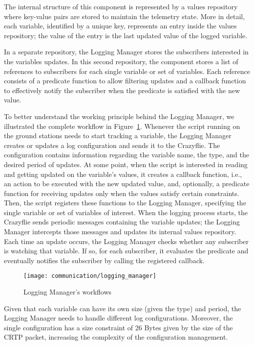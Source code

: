 The internal structure of this component is represented by a values repository where key-value pairs are stored to maintain the telemetry state.
More in detail, each variable, identified by a unique key, represents an entry inside the values repository; the value of the entry is the last updated value of the logged variable.

In a separate repository, the Logging Manager stores the subscribers interested in the variables updates. 
In this second repository, the component stores a list of references to subscribers for each single variable or set of variables. 
Each reference consists of a predicate function to allow filtering updates and a callback function to effectively notify the subscriber when the predicate is satisfied with the new value.

To better understand the working principle behind the Logging Manager, we illustrated the complete workflow in Figure~\ref{fig:logging_manager}.
Whenever the script running on the ground stations needs to start tracking a variable, the Logging Manager creates or updates a log configuration and sends it to the Crazyflie.
The configuration contains information regarding the variable name, the type, and the desired period of updates. 
At some point, when the script is interested in reading and getting updated on the variable's values, it creates a callback function, i.e., an action to be executed with the new updated value, and, optionally, a predicate function for receiving updates only when the values satisfy certain constraints.
Then, the script registers these functions to the Logging Manager, specifying the single variable or set of variables of interest.
When the logging process starts, the Crazyflie sends periodic messages containing the variable updates; the Logging Manager intercepts those messages and updates its internal values repository.
Each time an update occurs, the Logging Manager checks whether any subscriber is watching that variable. 
If so, for each subscriber, it evaluates the predicate and eventually notifies the subscriber by calling the registered callback. 


\begin{figure}[h]
    \centering
    \texttt{[image: communication/logging\_manager]}
    \caption{Logging Manager's workflows}\label{fig:logging_manager}
\end{figure}

Given that each variable can have its own size (given the type) and period, the Logging Manager needs to handle different log configurations.
Moreover, the single configuration has a size constraint of 26 Bytes given by the size of the CRTP packet, increasing the complexity of the configuration management.

